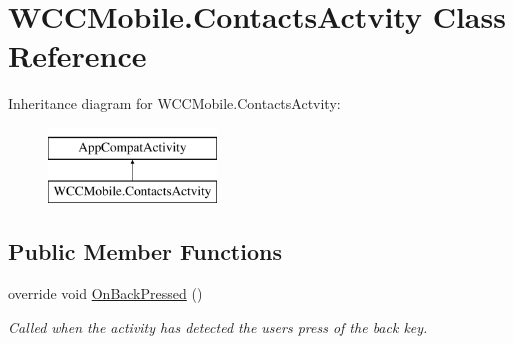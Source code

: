 \hypertarget{class_w_c_c_mobile_1_1_contacts_actvity}{}\section{W\+C\+C\+Mobile.\+Contacts\+Actvity Class Reference}
\label{class_w_c_c_mobile_1_1_contacts_actvity}
Inheritance diagram for W\+C\+C\+Mobile.\+Contacts\+Actvity\+:\begin{figure}[H]
\begin{center}
\leavevmode
\includegraphics[height=2.000000cm]{class_w_c_c_mobile_1_1_contacts_actvity}
\end{center}
\end{figure}
\subsection*{Public Member Functions}
\begin{DoxyCompactItemize}
\item 
override void \hyperlink{class_w_c_c_mobile_1_1_contacts_actvity_a26bf3f5f6f12d20de073e2c66b808635}{On\+Back\+Pressed} ()
\begin{DoxyCompactList}\small\item\em Called when the activity has detected the user\textquotesingle{}s press of the back key. \end{DoxyCompactList}\end{DoxyCompactItemize}
